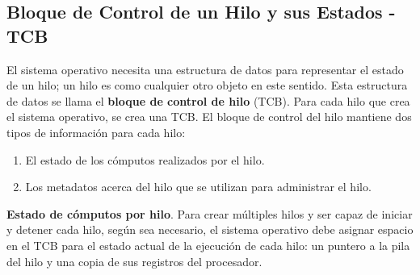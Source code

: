 \documentclass[10pt]{book}
\begin{document}
\subsection{Bloque de Control de un Hilo y sus Estados - TCB}
El sistema operativo necesita una estructura de datos para representar el estado de un hilo; un hilo es como cualquier otro objeto en este sentido. Esta estructura de datos se llama el \textbf{bloque de control de hilo} (TCB). Para cada hilo que crea el sistema operativo, se crea una TCB. El bloque de control del hilo mantiene dos tipos de información para cada hilo:
\begin{enumerate}
\item El estado de los cómputos realizados por el hilo.
\item Los metadatos acerca del hilo que se utilizan para administrar el hilo.
\end{enumerate}

\textbf{Estado de cómputos por hilo}. Para crear múltiples hilos y ser capaz de iniciar y detener cada hilo, según sea necesario, el sistema operativo debe asignar espacio en el TCB para el estado actual de la ejecución de cada hilo: un puntero a la pila del hilo y una copia de sus registros del procesador.
\end{document}
